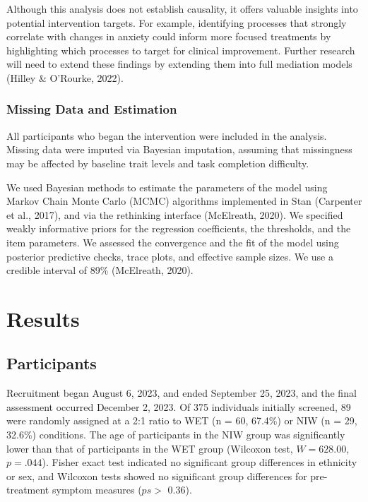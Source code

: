 \documentclass[
  man,floatsintext]{apa7}
\begin{document}
Although this analysis does not establish causality, it offers valuable insights into potential intervention targets.
For example, identifying processes that strongly correlate with changes in anxiety could inform more focused treatments by highlighting which processes to target for clinical improvement.
Further research will need to extend these findings by extending them into full mediation models (Hilley \& O'Rourke, 2022).

\subsubsection{Missing Data and Estimation}\label{missing-data-and-estimation}

All participants who began the intervention were included in the analysis.
Missing data were imputed via Bayesian imputation, assuming that missingness may be affected by baseline trait levels and task completion difficulty.

We used Bayesian methods to estimate the parameters of the model using Markov Chain Monte Carlo (MCMC) algorithms implemented in Stan (Carpenter et al., 2017), and via the rethinking interface (McElreath, 2020).
We specified weakly informative priors for the regression coefficients, the thresholds, and the item parameters.
We assessed the convergence and the fit of the model using posterior predictive checks, trace plots, and effective sample sizes.
We use a credible interval of 89\% (McElreath, 2020).

\section{Results}\label{results}

\subsection{Participants}\label{participants-1}

Recruitment began August 6, 2023, and ended September 25, 2023, and the final assessment occurred December 2, 2023.
Of 375 individuals initially screened,
89 were randomly assigned at a 2:1 ratio to WET (n = 60, 67.4\%) or NIW (n = 29, 32.6\%) conditions.
The age of participants in the NIW group was significantly lower than that of participants in the WET group (Wilcoxon test, \(W = 628.00\), \(p = .044\)).
Fisher exact test indicated no significant group differences in ethnicity or sex, and Wilcoxon tests showed no significant group differences for pre-treatment symptom measures (\(ps >\) 0.36).
\end{document}
